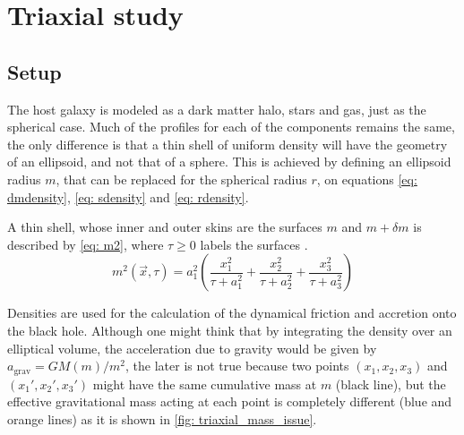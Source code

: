
%



\chapter{Triaxial study}
	\section{Setup}	
	The host galaxy is modeled as a dark matter halo, stars and gas, just as the spherical case. Much of the profiles for each of the components remains the same, the only difference is that a thin shell of uniform density will have the geometry of an ellipsoid, and not that of a sphere. This is achieved by defining an ellipsoid radius $m$, that can be replaced for the spherical radius $r$, on equations \ref{eq: dmdensity}, \ref{eq: sdensity} and \autoref{eq: rdensity}. 
	
	A thin shell, whose inner and outer skins are the surfaces $m$ and $m + \delta m$ is described by \autoref{eq: m2}, where $\tau \geq 0$ labels the surfaces \cite{binney2011galactic}.
	\begin{equation}\label{eq: m2}
		m^2(\vec{x}, \tau) = a_1^2\left(\frac{x_1^{2}}{\tau + a_{1}^{2}} + \frac{x_2^{2}}{\tau + a_{2}^{2}} + \frac{x_3^{2}}{\tau + a_{3}^{2}}\right)
	\end{equation}
	
	Densities are used for the calculation of the dynamical friction and accretion onto the black hole. Although one might think that by integrating the density over an elliptical volume, the acceleration due to gravity would be given by $a_\text{grav} = GM(m)/m^2$, the later is not true because two points $(x_1, x_2, x_3)$ and $(x_1', x_2', x_3')$ might have the same cumulative mass at $m$ (black line), but the effective gravitational mass acting at each point is completely different (blue and orange lines) as it is shown in \autoref{fig: triaxial_mass_issue}.
	
